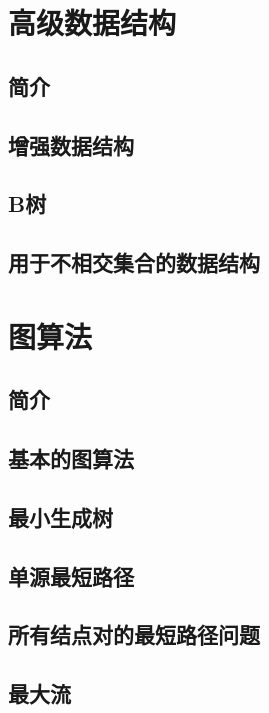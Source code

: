 \documentclass[lang=cn,newtx,10pt,scheme=chinese]{elegantbook}
\begin{document}
\part{高级数据结构}

\chapter*{简介}

\chapter{增强数据结构}

\chapter{B树}

\chapter{用于不相交集合的数据结构}

\part{图算法}

\chapter*{简介}

\chapter{基本的图算法}

\chapter{最小生成树}

\chapter{单源最短路径}

\chapter{所有结点对的最短路径问题}

\chapter{最大流}
\end{document}
